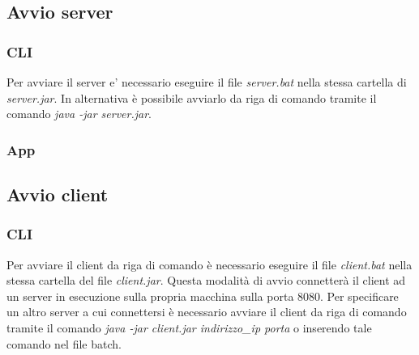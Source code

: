 \subsection{Avvio server}
\subsubsection{CLI}
\noindent Per avviare il server e' necessario eseguire il file \textit{server.bat} nella stessa cartella di \textit{server.jar}. In alternativa è possibile avviarlo da riga di comando tramite il comando \textit{java -jar server.jar}.

\subsubsection{App}
\noindent

\subsection{Avvio client}
\subsubsection{CLI}
\noindent Per avviare il client da riga di comando è necessario eseguire il file \textit{client.bat} nella stessa cartella del file \textit{client.jar}. Questa modalità di avvio connetterà il client ad un server in esecuzione sulla propria macchina sulla porta 8080. Per specificare un altro server a cui connettersi è necessario
avviare il client da riga di comando tramite il comando \textit{java -jar client.jar indirizzo\_ip porta} o inserendo tale comando nel file batch.


